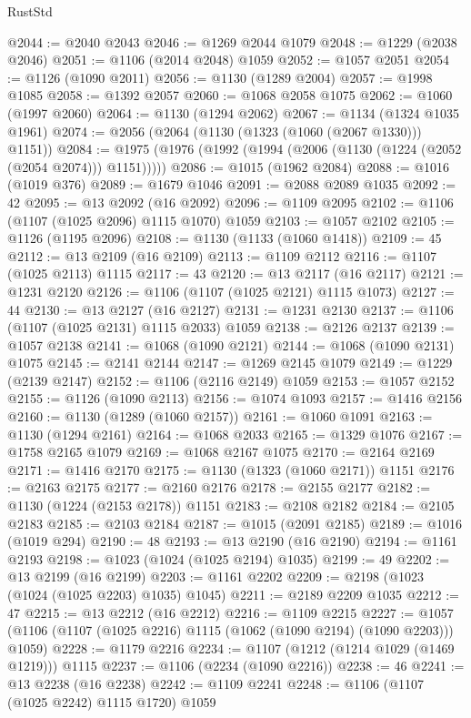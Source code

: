 \begin{lexlean}{RustStd}
\begin{coremodule}
{\begin{coremodule}
{{{{{{{{{{{{{{{{{{{{{{{{{{{{{{{{{{{@2044 := @2040 @2043
@2046 := @1269 @2044 @1079
@2048 := @1229 (@2038 @2046)
@2051 := @1106 (@2014 @2048) @1059
@2052 := @1057 @2051
@2054 := @1126 (@1090 @2011)
@2056 := @1130 (@1289 @2004)
@2057 := @1998 @1085
@2058 := @1392 @2057
@2060 := @1068 @2058 @1075
@2062 := @1060 (@1997 @2060)
@2064 := @1130 (@1294 @2062)
@2067 := @1134 (@1324 @1035 @1961)
@2074 := @2056 (@2064 (@1130 (@1323 (@1060 (@2067 @1330))) @1151))
@2084 := @1975 (@1976 (@1992 (@1994 (@2006 (@1130 (@1224 (@2052 (@2054 @2074))) @1151)))))
@2086 := @1015 (@1962 @2084)
@2088 := @1016 (@1019 @376)
@2089 := @1679 @1046
@2091 := @2088 @2089 @1035
@2092 := 42
@2095 := @13 @2092 (@16 @2092)
@2096 := @1109 @2095
@2102 := @1106 (@1107 (@1025 @2096) @1115 @1070) @1059
@2103 := @1057 @2102
@2105 := @1126 (@1195 @2096)
@2108 := @1130 (@1133 (@1060 @1418))
@2109 := 45
@2112 := @13 @2109 (@16 @2109)
@2113 := @1109 @2112
@2116 := @1107 (@1025 @2113) @1115
@2117 := 43
@2120 := @13 @2117 (@16 @2117)
@2121 := @1231 @2120
@2126 := @1106 (@1107 (@1025 @2121) @1115 @1073)
@2127 := 44
@2130 := @13 @2127 (@16 @2127)
@2131 := @1231 @2130
@2137 := @1106 (@1107 (@1025 @2131) @1115 @2033) @1059
@2138 := @2126 @2137
@2139 := @1057 @2138
@2141 := @1068 (@1090 @2121)
@2144 := @1068 (@1090 @2131) @1075
@2145 := @2141 @2144
@2147 := @1269 @2145 @1079
@2149 := @1229 (@2139 @2147)
@2152 := @1106 (@2116 @2149) @1059
@2153 := @1057 @2152
@2155 := @1126 (@1090 @2113)
@2156 := @1074 @1093
@2157 := @1416 @2156
@2160 := @1130 (@1289 (@1060 @2157))
@2161 := @1060 @1091
@2163 := @1130 (@1294 @2161)
@2164 := @1068 @2033
@2165 := @1329 @1076
@2167 := @1758 @2165 @1079
@2169 := @1068 @2167 @1075
@2170 := @2164 @2169
@2171 := @1416 @2170
@2175 := @1130 (@1323 (@1060 @2171)) @1151
@2176 := @2163 @2175
@2177 := @2160 @2176
@2178 := @2155 @2177
@2182 := @1130 (@1224 (@2153 @2178)) @1151
@2183 := @2108 @2182
@2184 := @2105 @2183
@2185 := @2103 @2184
@2187 := @1015 (@2091 @2185)
@2189 := @1016 (@1019 @294)
@2190 := 48
@2193 := @13 @2190 (@16 @2190)
@2194 := @1161 @2193
@2198 := @1023 (@1024 (@1025 @2194) @1035)
@2199 := 49
@2202 := @13 @2199 (@16 @2199)
@2203 := @1161 @2202
@2209 := @2198 (@1023 (@1024 (@1025 @2203) @1035) @1045)
@2211 := @2189 @2209 @1035
@2212 := 47
@2215 := @13 @2212 (@16 @2212)
@2216 := @1109 @2215
@2227 := @1057 (@1106 (@1107 (@1025 @2216) @1115 (@1062 (@1090 @2194) (@1090 @2203))) @1059)
@2228 := @1179 @2216
@2234 := @1107 (@1212 (@1214 @1029 (@1469 @1219))) @1115
@2237 := @1106 (@2234 (@1090 @2216))
@2238 := 46
@2241 := @13 @2238 (@16 @2238)
@2242 := @1109 @2241
@2248 := @1106 (@1107 (@1025 @2242) @1115 @1720) @1059
}}}}}}}}}}}}}}}}}}}}}}}}}}}}}}}}}}}
\end{coremodule}}
\end{coremodule}
\end{lexlean}
